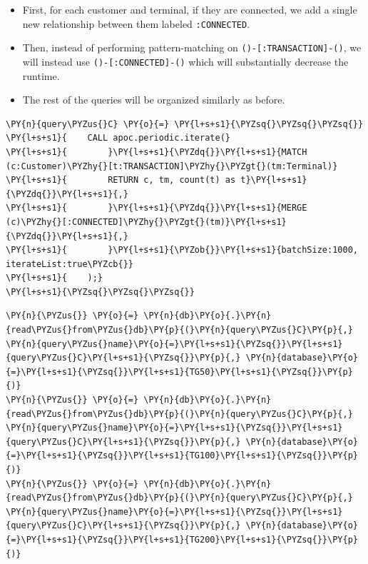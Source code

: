 \begin{itemize}
\tightlist
\item
  First, for each customer and terminal, if they are connected, we add a
  single new relationship between them labeled \texttt{:CONNECTED}.
\item
  Then, instead of performing pattern-matching on
  \texttt{()-{[}:TRANSACTION{]}-()}, we will instead use
  \texttt{()-{[}:CONNECTED{]}-()} which will substantially decrease the
  runtime.
\item
  The rest of the queries will be organized similarly as before.
\end{itemize}

    \begin{tcolorbox}[breakable, size=fbox, boxrule=1pt, pad at break*=1mm,colback=cellbackground, colframe=cellborder]
\begin{Verbatim}[commandchars=\\\{\}]
\PY{n}{query\PYZus{}C} \PY{o}{=} \PY{l+s+s1}{\PYZsq{}\PYZsq{}\PYZsq{}}
\PY{l+s+s1}{    CALL apoc.periodic.iterate(}
\PY{l+s+s1}{        }\PY{l+s+s1}{\PYZdq{}}\PY{l+s+s1}{MATCH (c:Customer)\PYZhy{}[t:TRANSACTION]\PYZhy{}\PYZgt{}(tm:Terminal)}
\PY{l+s+s1}{        RETURN c, tm, count(t) as t}\PY{l+s+s1}{\PYZdq{}}\PY{l+s+s1}{,}
\PY{l+s+s1}{        }\PY{l+s+s1}{\PYZdq{}}\PY{l+s+s1}{MERGE (c)\PYZhy{}[:CONNECTED]\PYZhy{}\PYZgt{}(tm)}\PY{l+s+s1}{\PYZdq{}}\PY{l+s+s1}{,}
\PY{l+s+s1}{        }\PY{l+s+s1}{\PYZob{}}\PY{l+s+s1}{batchSize:1000, iterateList:true\PYZcb{}}
\PY{l+s+s1}{    );}
\PY{l+s+s1}{\PYZsq{}\PYZsq{}\PYZsq{}}
\end{Verbatim}
\end{tcolorbox}

    \begin{tcolorbox}[breakable, size=fbox, boxrule=1pt, pad at break*=1mm,colback=cellbackground, colframe=cellborder]
\begin{Verbatim}[commandchars=\\\{\}]
\PY{n}{\PYZus{}} \PY{o}{=} \PY{n}{db}\PY{o}{.}\PY{n}{read\PYZus{}from\PYZus{}db}\PY{p}{(}\PY{n}{query\PYZus{}C}\PY{p}{,} \PY{n}{query\PYZus{}name}\PY{o}{=}\PY{l+s+s1}{\PYZsq{}}\PY{l+s+s1}{query\PYZus{}C}\PY{l+s+s1}{\PYZsq{}}\PY{p}{,} \PY{n}{database}\PY{o}{=}\PY{l+s+s1}{\PYZsq{}}\PY{l+s+s1}{TG50}\PY{l+s+s1}{\PYZsq{}}\PY{p}{)}
\PY{n}{\PYZus{}} \PY{o}{=} \PY{n}{db}\PY{o}{.}\PY{n}{read\PYZus{}from\PYZus{}db}\PY{p}{(}\PY{n}{query\PYZus{}C}\PY{p}{,} \PY{n}{query\PYZus{}name}\PY{o}{=}\PY{l+s+s1}{\PYZsq{}}\PY{l+s+s1}{query\PYZus{}C}\PY{l+s+s1}{\PYZsq{}}\PY{p}{,} \PY{n}{database}\PY{o}{=}\PY{l+s+s1}{\PYZsq{}}\PY{l+s+s1}{TG100}\PY{l+s+s1}{\PYZsq{}}\PY{p}{)}
\PY{n}{\PYZus{}} \PY{o}{=} \PY{n}{db}\PY{o}{.}\PY{n}{read\PYZus{}from\PYZus{}db}\PY{p}{(}\PY{n}{query\PYZus{}C}\PY{p}{,} \PY{n}{query\PYZus{}name}\PY{o}{=}\PY{l+s+s1}{\PYZsq{}}\PY{l+s+s1}{query\PYZus{}C}\PY{l+s+s1}{\PYZsq{}}\PY{p}{,} \PY{n}{database}\PY{o}{=}\PY{l+s+s1}{\PYZsq{}}\PY{l+s+s1}{TG200}\PY{l+s+s1}{\PYZsq{}}\PY{p}{)}
\end{Verbatim}
\end{tcolorbox}

